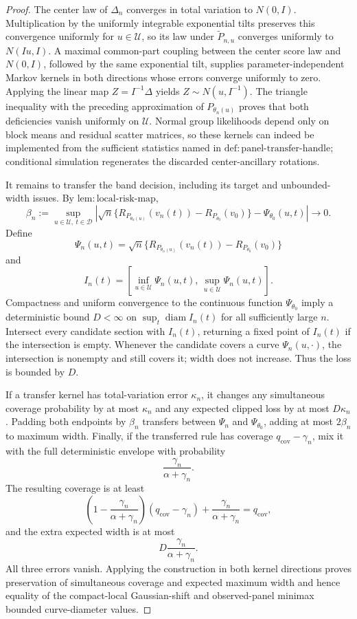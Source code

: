 \documentclass{article}
\begin{document}
\begin{proof}
The center law of \(\Delta_n\) converges in total variation to \(N(0,I)\).  Multiplication by the uniformly integrable exponential tilts preserves this convergence uniformly for \(u\in\mathcal U\), so its law under \(\widetilde P_{n,u}\) converges uniformly to \(N(Iu,I)\).  A maximal common-part coupling between the center score law and \(N(0,I)\), followed by the same exponential tilt, supplies parameter-independent Markov kernels in both directions whose errors converge uniformly to zero.  Applying the linear map \(Z=I^{-1}\Delta\) yields \(Z\sim N(u,I^{-1})\).  The triangle inequality with the preceding approximation of \(P_{\theta_n(u)}\) proves that both deficiencies vanish uniformly on \(\mathcal U\).  Normal group likelihoods depend only on block means and residual scatter matrices, so these kernels can indeed be implemented from the sufficient statistics named in \(\mathrm{def:panel\mbox{-}transfer\mbox{-}handle}\); conditional simulation regenerates the discarded center-ancillary rotations.

It remains to transfer the band decision, including its target and unbounded-width issues.  By \(\mathrm{lem:local\mbox{-}risk\mbox{-}map}\),
\[
\beta_n:=
\sup_{u\in\mathcal U,\ t\in\mathcal D}
\left|
\sqrt n\{R_{P_{\theta_n(u)}}(v_n(t))
-R_{P_{\theta_0}}(v_0)\}
-\Psi_{\theta_0}(u,t)
\right|
\longrightarrow0.
\]
Define
\[
\Psi_n(u,t)=
\sqrt n\{R_{P_{\theta_n(u)}}(v_n(t))
-R_{P_{\theta_0}}(v_0)\}
\]
and
\[
I_n(t)=
\left[
\inf_{u\in\mathcal U}\Psi_n(u,t),\,
\sup_{u\in\mathcal U}\Psi_n(u,t)
\right].
\]
Compactness and uniform convergence to the continuous function \(\Psi_{\theta_0}\) imply a deterministic bound \(D<\infty\) on
\(\sup_t\operatorname{diam}I_n(t)\) for all sufficiently large \(n\).  Intersect every candidate section with \(I_n(t)\), returning a fixed point of \(I_n(t)\) if the intersection is empty.  Whenever the candidate covers a curve \(\Psi_n(u,\cdot)\), the intersection is nonempty and still covers it; width does not increase.  Thus the loss is bounded by \(D\).

If a transfer kernel has total-variation error \(\kappa_n\), it changes any simultaneous coverage probability by at most \(\kappa_n\) and any expected clipped loss by at most \(D\kappa_n\).  Padding both endpoints by \(\beta_n\) transfers between \(\Psi_n\) and \(\Psi_{\theta_0}\), adding at most \(2\beta_n\) to maximum width.  Finally, if the transferred rule has coverage \(q_{\mathrm{cov}}-\gamma_n\), mix it with the full deterministic envelope with probability
\[
\frac{\gamma_n}{\alpha+\gamma_n}.
\]
The resulting coverage is at least
\[
\left(1-\frac{\gamma_n}{\alpha+\gamma_n}\right)
(q_{\mathrm{cov}}-\gamma_n)
+\frac{\gamma_n}{\alpha+\gamma_n}
=q_{\mathrm{cov}},
\]
and the extra expected width is at most
\[
D\frac{\gamma_n}{\alpha+\gamma_n}.
\]
All three errors vanish.  Applying the construction in both kernel directions proves preservation of simultaneous coverage and expected maximum width and hence equality of the compact-local Gaussian-shift and observed-panel minimax bounded curve-diameter values.
\end{proof}
\end{document}
